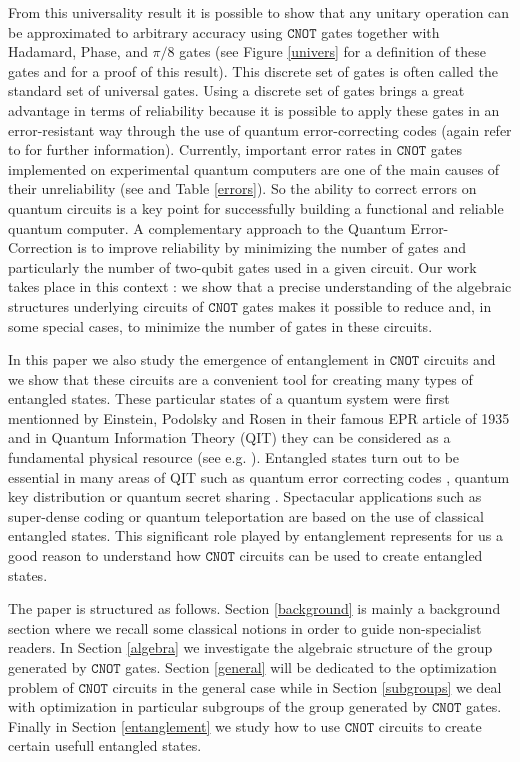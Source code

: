 \documentclass[a4paper,12pt,fleqn]{article}
\newcommand\cnot{\mathtt{CNOT}}
\begin{document}
From this universality result it is possible to show that any unitary operation can be approximated to arbitrary accuracy using $\cnot$ gates together with Hadamard, Phase, and  $\pi/8$  gates (see Figure \ref{univers} for a definition of these gates and \cite[Section 4.5.3]{NCI2011} for a proof of this result). This discrete set of gates is often called the standard set of universal gates. Using a discrete set of gates brings a great advantage in terms of reliability because it is possible to apply these gates in an error-resistant way
through the use of quantum error-correcting codes (again refer to \cite[Chapter 10]{NCI2011} for further information). Currently, important error rates in $\cnot$ gates implemented on experimental quantum computers are one of the main causes of their unreliability (see  \cite{2017Monroe,2019Wright} and Table \ref{errors}). So the ability to correct errors on quantum circuits is a key point for successfully building a functional and reliable quantum computer. A complementary approach to the Quantum Error-Correction is to improve reliability by minimizing the number of gates and particularly the number of two-qubit gates used in a given circuit. Our work takes place in this context : we show that a precise understanding of the algebraic structures underlying circuits of $\cnot$ gates makes it possible to reduce and, in some special cases, to minimize the number of gates in these circuits.\medskip


In this paper we also study the emergence of entanglement in  $\cnot$ circuits and we show that these circuits are a convenient tool for creating many types of entangled states. These particular states of a quantum system were first mentionned by Einstein, Podolsky and Rosen in their famous EPR article of 1935 \cite{EPR} and in Quantum Information Theory (QIT) they can be considered as a fundamental physical resource  (see e.g.  \cite{HHHH2009}). Entangled states turn out to be essential in many areas of QIT such as quantum error correcting codes \cite{2007GW}, quantum key distribution \cite{1991Ekert} or quantum secret sharing \cite{1999CGL}. Spectacular applications such as super-dense coding \cite{1992BWS} or quantum teleportation \cite{1994Vaidman,1998FSBFKP,2015PESWFB} are based on the use of classical entangled states. This significant role played by entanglement represents for us a good reason to understand how $\cnot$ circuits can be used to create entangled states.\medskip

The paper is structured  as follows. Section \ref{background} is mainly a background section where we recall some classical notions in order to guide non-specialist
readers. In Section \ref{algebra} we investigate the algebraic structure of the group generated by $\cnot$ gates.
Section \ref{general} will be dedicated to the optimization problem of $\cnot$ circuits in the general case while in Section \ref{subgroups} we deal with optimization in particular subgroups of the group generated by $\cnot$ gates.
Finally in Section \ref{entanglement} we study how to use $\cnot$ circuits to create certain usefull entangled states.
\end{document}
